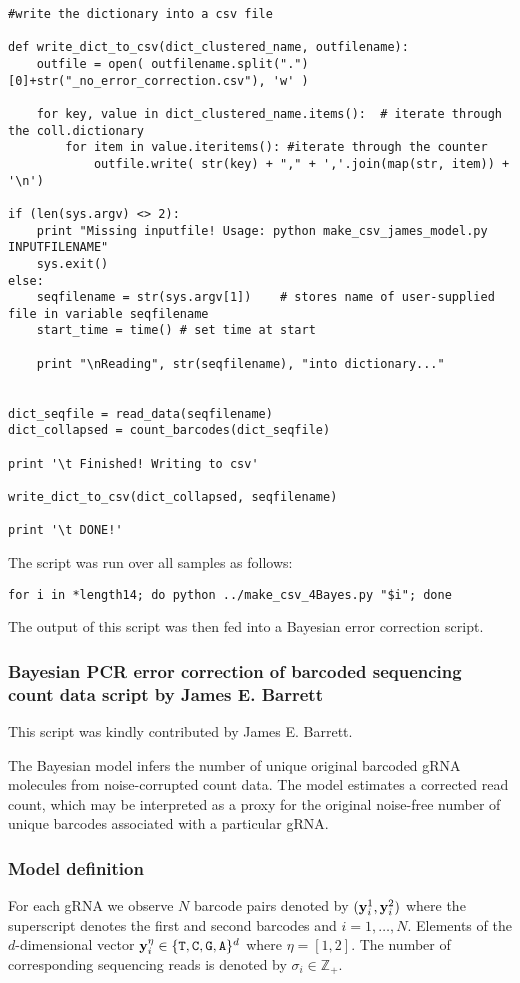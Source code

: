 \begin{footnotesize}
\begin{lstlisting}
#write the dictionary into a csv file

def write_dict_to_csv(dict_clustered_name, outfilename):
    outfile = open( outfilename.split(".")[0]+str("_no_error_correction.csv"), 'w' )

    for key, value in dict_clustered_name.items():  # iterate through the coll.dictionary
        for item in value.iteritems(): #iterate through the counter
            outfile.write( str(key) + "," + ','.join(map(str, item)) + '\n')

if (len(sys.argv) <> 2):
    print "Missing inputfile! Usage: python make_csv_james_model.py INPUTFILENAME"
    sys.exit()
else:
    seqfilename = str(sys.argv[1])    # stores name of user-supplied file in variable seqfilename
    start_time = time() # set time at start

    print "\nReading", str(seqfilename), "into dictionary..."


dict_seqfile = read_data(seqfilename)
dict_collapsed = count_barcodes(dict_seqfile)

print '\t Finished! Writing to csv'

write_dict_to_csv(dict_collapsed, seqfilename)

print '\t DONE!'
\end{lstlisting}

The script was run over all samples as follows:

\begin{lstlisting}
for i in *length14; do python ../make_csv_4Bayes.py "$i"; done
\end{lstlisting}

The output of this script was then fed into a Bayesian error correction script.

\subsubsection{Bayesian PCR error correction of barcoded sequencing count data script by James E. Barrett}

This script was kindly contributed by James E. Barrett. 

The Bayesian model infers the number of unique original barcoded gRNA molecules from noise-corrupted count data. The model estimates a corrected read count, which may be interpreted as a proxy for the original noise-free number of unique barcodes associated with a particular gRNA. 

\subsubsection{Model definition}
For each gRNA we observe $N$ barcode pairs denoted by $(\boldsymbol{\mathbf{y}}_{i}^1,\boldsymbol{\mathbf{y}}_{i}^2)$ where the superscript denotes the first and second barcodes and $i=1,\ldots,N$. Elements of the $d$-dimensional vector $\vecy_{i}^{\eta}\in\{\verb+T+,\verb+C+,\verb+G+,\verb+A+\}^d$ where $\eta=[1,2]$. The number of corresponding sequencing reads is denoted by $\sigma_{i}\in\mathbb{Z}_+$. 


\end{footnotesize}
